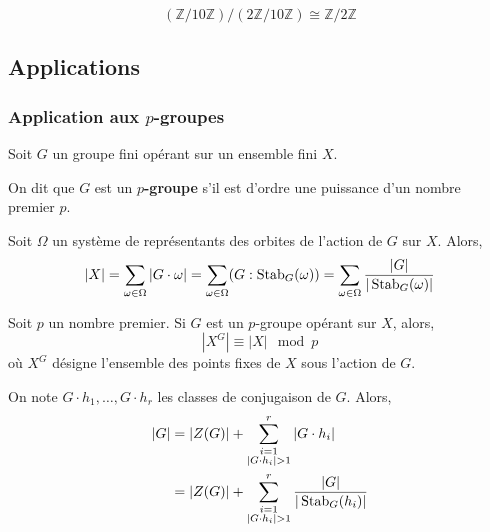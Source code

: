   \begin{example}
    \[ (\mathbb{Z}/10\mathbb{Z})/(2\mathbb{Z}/10\mathbb{Z}) \cong \mathbb{Z}/2\mathbb{Z} \]
  \end{example}

  \subsection{Applications}

  \subsubsection{Application aux \texorpdfstring{$p$}{p}-groupes}


  Soit $G$ un groupe fini opérant sur un ensemble fini $X$.

  \begin{definition}
    On dit que $G$ est un \textbf{$p$-groupe} s'il est d'ordre une puissance d'un nombre premier $p$.
  \end{definition}

  \begin{theorem}
    Soit $\Omega$ un système de représentants des orbites de l'action de $G$ sur $X$. Alors,
    \[ |X| = \sum_{\omega \in \Omega} |G \cdot \omega| = \sum_{\omega \in \Omega} (G : \operatorname{Stab}_G(\omega)) = \sum_{\omega \in \Omega} \frac{|G|}{|\operatorname{Stab}_G(\omega)|} \]
  \end{theorem}

  \begin{corollary}
    Soit $p$ un nombre premier. Si $G$ est un $p$-groupe opérant sur $X$, alors,
    \[ |X^G| \equiv |X| \mod p \]
    où $X^G$ désigne l'ensemble des points fixes de $X$ sous l'action de $G$.
  \end{corollary}

  \begin{corollary}
    On note $G \cdot h_1, \dots, G \cdot h_r$ les classes de conjugaison de $G$. Alors,
    \begin{align*}
      \vert G \vert &= \vert Z(G) \vert + \sum_{\substack{i=1 \\ \vert G \cdot h_i \vert > 1}}^{r} \vert G \cdot h_i \vert \\
      &= \vert Z(G) \vert + \sum_{\substack{i=1 \\ \vert G \cdot h_i \vert > 1}}^{r} \frac{\vert G \vert}{\vert \operatorname{Stab}_G(h_i) \vert}
    \end{align*}
  \end{corollary}

